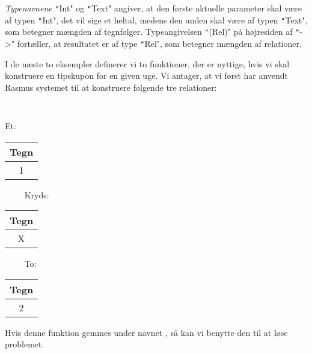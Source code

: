 \documentclass{article}
\newcounter{eks}
\begin{document}
{\em Typenavnene\/} \texttt"Int" og \texttt"Text" angiver, at den f\o{}rste
aktuelle parameter skal v\ae{}re af typen \texttt"Int", det vil sige et heltal,
medens den anden skal v\ae{}re af typen \texttt"Text", som betegner
m\ae{}ngden af tegnf\o{}lger. Typeangivelsen \texttt"(Rel)" p\aa{}
h\o{}jresiden af \texttt"->" fort\ae{}ller, at resultatet er af type
\texttt"Rel", som betegner m\ae{}ngden af relationer.

I de n\ae{}ste to eksempler definerer vi to funktioner, der er nyttige, hvis
vi skal konstruere en tipskupon for en given uge. Vi antager, at vi f\o{}rst
har anvendt {\sc Rasmus} systemet til at konstruere f\o{}lgende
tre relationer:
{\tt
\begin{center}
Et:~\begin{tabular}{|c|} \hline Tegn \\\hline 1 \\\hline\end{tabular}~~~~
Kryds:~\begin{tabular}{|c|} \hline Tegn \\\hline X \\\hline\end{tabular}~~~~
To:~\begin{tabular}{|c|} \hline Tegn \\\hline 2 \\\hline\end{tabular}
\end{center}
}


Hvis denne funktion gemmes under navnet , s\aa{} kan vi
benytte den til at l\o{}se problemet.
\end{document}
